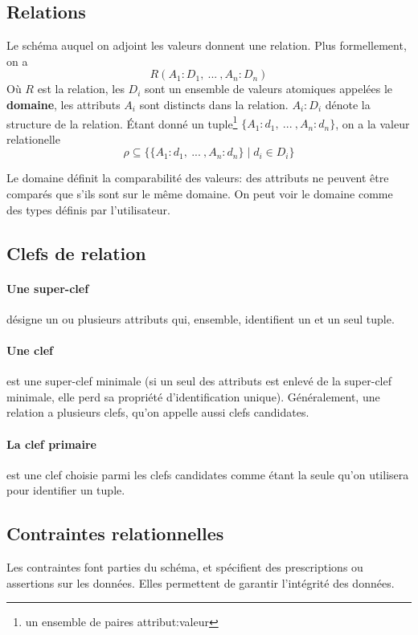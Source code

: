 \documentclass[a4paper]{article}
\begin{document}
\subsection{Relations}
Le schéma auquel on adjoint les valeurs donnent une relation. Plus formellement, on a
\begin{equation}
  R(A_1:D_1, ~ ... ~ , A_n:D_n)
\end{equation}
Où $R$ est la relation, les $D_i$ sont un ensemble de valeurs atomiques appelées le \textbf{domaine},
les attributs $A_i$ sont distincts dans la relation. $A_i : D_i$ dénote la structure de la relation.
\'Etant donné un tuple\footnote{un ensemble de paires attribut:valeur} $\{A_1: d_1, ~...~, A_n: d_n\}$, on a la valeur relationelle
\begin{equation}
  \rho \subseteq \{\{A_1:d_1, ~...~, A_n:d_n\} \mid d_i \in D_i\}
\end{equation}

Le domaine définit la comparabilité des valeurs: des attributs ne peuvent être comparés
que s'ils sont sur le même domaine. On peut voir le domaine comme des types définis par
l'utilisateur.

\subsection{Clefs de relation}

\paragraph{Une super-clef} désigne un ou plusieurs attributs qui, ensemble, identifient
un et un seul tuple.

\paragraph{Une clef} est une super-clef minimale (si un seul des attributs est
enlevé de la super-clef minimale, elle perd sa propriété d'identification unique).
Généralement, une relation a plusieurs clefs, qu'on appelle aussi clefs candidates.

\paragraph{La clef primaire} est une clef choisie parmi les clefs candidates comme étant
la seule qu'on utilisera pour identifier un tuple.

\subsection{Contraintes relationnelles}
Les contraintes font parties du schéma, et spécifient des prescriptions ou
assertions sur les données. Elles permettent de garantir l'intégrité des données.
\end{document}
